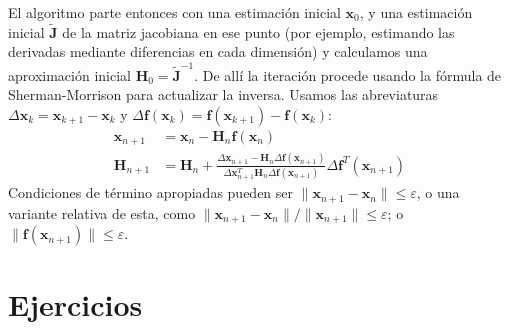  El algoritmo parte entonces con una estimación inicial \(\mathbf{x}_0\),
  y una estimación inicial  \(\widetilde{\mathbf{J}}\)
  de la matriz jacobiana en ese punto
  (por ejemplo,
   estimando las derivadas mediante diferencias en cada dimensión)
  y calculamos una aproximación inicial
    \(\mathbf{H}_0 = \widetilde{\mathbf{J}}^{-1}\).
  De allí la iteración procede usando la fórmula de Sherman-Morrison
  para actualizar la inversa.
  Usamos las abreviaturas
  \(\Delta \mathbf{x}_k = \mathbf{x}_{k + 1} - \mathbf{x}_k\)
  y \(\Delta \mathbf{f}(\mathbf{x}_k)
        = \mathbf{f}(\mathbf{x}_{k + 1}) - \mathbf{f}(\mathbf{x}_k)\):
  \begin{align*}
    \mathbf{x}_{n + 1}
      &= \mathbf{x}_n - \mathbf{H}_n \mathbf{f}(\mathbf{x}_n) \\
    \mathbf{H}_{n + 1}
      &= \mathbf{H}_n
           + \frac{\Delta \mathbf{x}_{n + 1}
                     - \mathbf{H}_n \Delta \mathbf{f}(\mathbf{x}_{n + 1})}
                  {\Delta \mathbf{x}_{n + 1}^T
                     \mathbf{H}_n \Delta \mathbf{f}(\mathbf{x}_{n + 1})}
                \Delta \mathbf{f}^T(\mathbf{x}_{n + 1})
  \end{align*}
  Condiciones de término apropiadas
  pueden ser \(\lVert \mathbf{x}_{n + 1} - \mathbf{x}_n \rVert \le \varepsilon\),
  o una variante relativa de esta,
  como
  \(\lVert \mathbf{x}_{n + 1} - \mathbf{x}_n \rVert
      / \lVert \mathbf{x}_{n + 1} \rVert \le \varepsilon\);
  o \(\lVert \mathbf{f}(\mathbf{x}_{n + 1}) \rVert \le \varepsilon\).

\section*{Ejercicios}
\label{sec:ejercicios-03-seq}

